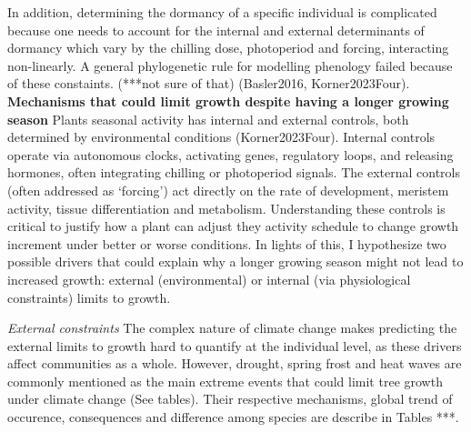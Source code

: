 \documentclass{article}
\begin{document}
In addition, determining the dormancy of a specific individual is complicated because one needs to account for the internal and external determinants of dormancy which vary by the chilling dose, photoperiod and forcing, interacting non-linearly. A general phylogenetic rule for modelling phenology failed because of these constaints. (***not sure of that) (Basler2016, Korner2023Four).
\textbf{Mechanisms that could limit growth despite having a longer growing season}
Plants seasonal activity has internal and external controls, both determined by environmental conditions (Korner2023Four). Internal controls operate via autonomous clocks, activating genes, regulatory loops, and releasing hormones, often integrating chilling or photoperiod signals. The external controls (often addressed as ‘forcing’) act directly on the rate of development, meristem activity, tissue differentiation and metabolism. Understanding these controls is critical to justify how a plant can adjust they activity schedule to change growth increment under better or worse conditions. 
In lights of this, I hypothesize two possible drivers that could explain why a longer growing season might not lead to increased growth: external (environmental) \cite{kolar_response_2016} or internal (via physiological constraints)\cite{zohner_effect_2023} limits to growth. 

\textit{External constraints}
The complex nature of climate change makes predicting the external limits to growth hard to quantify at the individual level, as these drivers affect communities as a whole. However, drought, spring frost and heat waves are commonly mentioned as the main extreme events that could limit tree growth under climate change \cite{tyree_xylem_2002, choat_triggers_2018, li_widespread_2023,trenberth_global_2014,intergovernmental_panel_on_climate_change_detection_2014,chiang_evidence_2021,polgar_leafout_2011,reinmann_compensatory_2023} (See tables). Their respective mechanisms, global trend of occurence, consequences and difference among species are describe in Tables ***. \\
\end{document}
